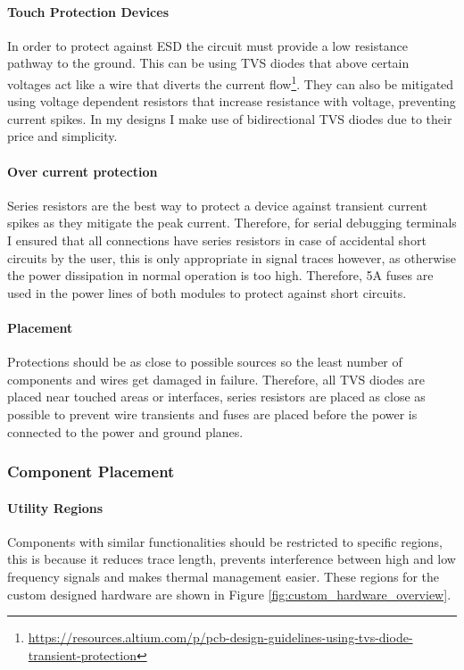\paragraph{Touch Protection Devices}
In order to protect against \gls{ESD} the circuit must provide a low resistance pathway to the ground. This can be using \gls{TVS} diodes that above certain voltages act like a wire that diverts the current flow\footnote{\url{https://resources.altium.com/p/pcb-design-guidelines-using-tvs-diode-transient-protection}}. They can also be mitigated using voltage dependent resistors that increase resistance with voltage, preventing current spikes. In my designs I make use of bidirectional \gls{TVS} diodes due to their price and simplicity. 
\paragraph{Over current protection}
Series resistors are the best way to protect a device against transient current spikes as they mitigate the peak current. Therefore, for serial debugging terminals I ensured that all connections have series resistors in case of accidental short circuits by the user, this is only appropriate in signal traces however, as otherwise the power dissipation in normal operation is too high. Therefore, 5A fuses are used in the power lines of both modules to protect against short circuits. 
\paragraph{Placement}
Protections should be as close to possible sources so the least number of components and wires get damaged in failure. Therefore, all \gls{TVS} diodes are placed near touched areas or interfaces, series resistors are placed as close as possible to prevent wire transients and fuses are placed before the power is connected to the power and ground planes.

\subsubsection{Component Placement}\label{sub_sub_section:tgt_component_placement}
\paragraph{Utility Regions}
Components with similar functionalities should be restricted to specific regions, this is because it reduces trace length, prevents interference between high and low frequency signals and makes thermal management easier. These regions for the custom designed hardware are shown in Figure \ref{fig:custom_hardware_overview}.
